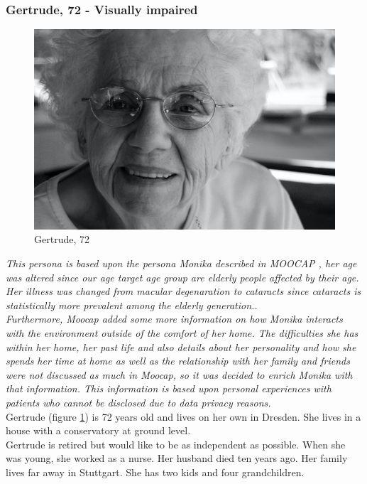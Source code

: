 \documentclass[plainarticle,zihtitle,english,final,hyperref,utf8]{zihpub}
\begin{document}
\subsubsection{Gertrude, 72 - Visually impaired}
\label{sec:gertrude}
\begin{figure}[h!]
  \begin{center}
    \includegraphics[width=.65\textwidth]{gertrude.jpg}
    \caption{Gertrude, 72 \cite{gertrude}}
    \label{fig:gertrude}
  \end{center}
\end{figure}
\emph{This persona is based upon the persona Monika described in MOOCAP \cite{monika}, her age was altered since our age target age group are elderly people affected by their age. Her illness was changed from macular degenaration to cataracts since cataracts is statistically more prevalent among the elderly generation.\cite{Klein1982}. \\
\newline
Furthermore, Moocap added some more information on how Monika interacts with the environment outside of the comfort of her home. The difficulties she has within her home, her past life and also details about her personality and how she spends her time at home as well as the relationship with her family and friends were not discussed as much in Moocap, so it was decided to enrich Monika with that information. This information is based upon personal experiences with patients who cannot be disclosed due to data privacy reasons.}\\
\newline
Gertrude (figure \ref{fig:gertrude}) is 72 years old and lives on her own in Dresden. She lives in a house with a conservatory at ground level.\\
Gertrude is retired but would like to be as independent as possible. When she was young, she worked as a nurse. Her husband died ten years ago. Her family lives far away in Stuttgart. She has two kids and four grandchildren.\\
\end{document}
